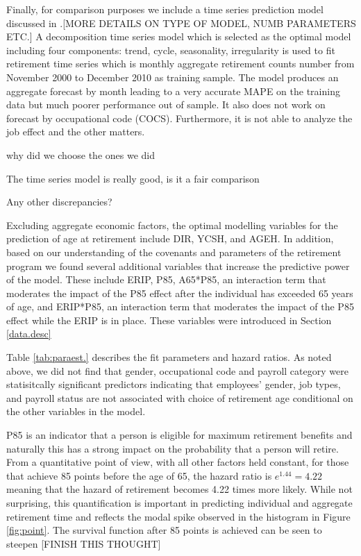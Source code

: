 \documentclass[12pt,letterpaper]{article}
\begin{document}
Finally, for comparison purposes we include a time series prediction model discussed in \cite{zhu2015}.[MORE DETAILS ON TYPE OF MODEL, NUMB PARAMETERS ETC.] A decomposition time series model which is selected as the optimal model including four components: trend, cycle, seasonality, irregularity is used to fit retirement time series which is monthly aggregate retirement counts number from November 2000 to December 2010 as training sample. The model produces an aggregate forecast by month leading to a very accurate MAPE on the training data but much poorer performance out of sample. It also does not work on forecast by occupational code (COCS). Furthermore, it is not able to analyze the job effect and the other matters.

why did we choose the ones we did

The time series model is really good, is it a fair comparison

Any other discrepancies?

Excluding aggregate economic factors, the optimal modelling variables for the prediction of age at retirement include DIR, YCSH, and AGEH.  In addition, based on our understanding of the covenants and parameters of the retirement program we found several additional variables that increase the predictive power of the model. These include ERIP, P85, A65*P85, an interaction term that moderates the impact of the P85 effect after the individual has exceeded 65 years of age, and  ERIP*P85, an interaction term that moderates the impact of the P85 effect while the ERIP is in place.  These variables were introduced in Section \ref{data.desc}

Table \ref{tab:paraest.} describes the fit parameters and hazard ratios.  As noted above, we did not find that gender, occupational code and payroll category were statisitcally significant predictors indicating that employees' gender, job types, and payroll status are not associated with choice of retirement age conditional on the other variables in the model.

P85 is an indicator that a person is eligible for maximum retirement benefits and naturally this has a strong impact on the probability that a person will retire.  From a quantitative point of view, with all other factors held constant, for those that achieve 85 points before the age of 65, the hazard ratio is $e^{1.44} = 4.22$ meaning that the hazard of retirement becomes 4.22 times more likely.  While not surprising, this quantification is important in predicting individual and aggregate retirement time and reflects the modal spike observed in the histogram in Figure \ref{fig:point}.  The survival function after 85 points is achieved can be seen to steepen [FINISH THIS THOUGHT] 
\end{document}
